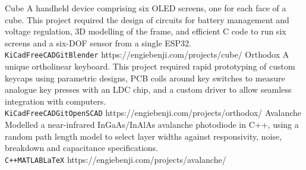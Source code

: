 \documentclass[9pt]{developercv} %
\begin{document}

	\begin{entrylist}
		\QRentry
			{Cube}
			{A handheld device comprising six OLED screens, one for each face of a cube. This project required the design of circuits for battery management and voltage regulation, 3D modelling of the frame, and efficient C code to run six screens and a six-DOF sensor from a single ESP32.\\ \texttt{KiCad}\slashsep\texttt{FreeCAD}\slashsep\texttt{Git}\slashsep\texttt{Blender}}
			{https://engiebenji.com/projects/cube/}
		\QRentry
			{Orthodox}
			{A unique ortholinear keyboard. This project required rapid prototyping of custom keycaps using parametric designs, PCB coils around key switches to measure analogue key presses with an LDC chip, and a custom driver to allow seamless integration with computers.\\\texttt{KiCad}\slashsep\texttt{FreeCAD}\slashsep\texttt{Git}\slashsep\texttt{OpenSCAD}}
			{https://engiebenji.com/projects/orthodox/}
		\QRentry
			{Avalanche}
			{Modelled a near-infrared InGaAs/InAlAs avalanche photodiode in C++, using a random path length model to select layer widths against responsivity, noise, breakdown and capacitance specifications.\\\texttt{C++}\slashsep\texttt{MATLAB}\slashsep\texttt{LaTeX}}
			{https://engiebenji.com/projects/avalanche/}
	\end{entrylist}

\end{document}
